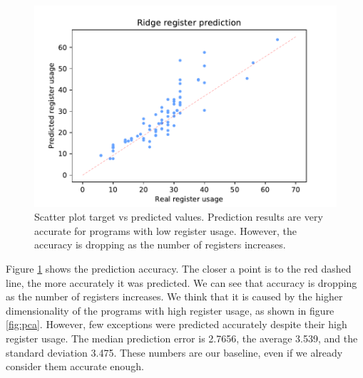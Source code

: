 \documentclass[sigplan,\review anonymous]{acmart}
\begin{document}
\begin{figure}
  \centering
  \includegraphics[width=\columnwidth]{images/ridge_pred.pdf}
  \caption{Scatter plot target vs predicted values. Prediction results are
  very accurate for programs with low register usage. However, the accuracy
  is dropping as the number of registers increases.}
  \label{fig:ridge_pred}
\end{figure}

Figure \ref{fig:ridge_pred} shows the prediction accuracy. The closer a point
is to the red dashed line, the more accurately it was predicted. We can see
that accuracy is dropping as the number of registers increases. We think that
it is caused by the higher dimensionality of the programs with high register
usage, as shown in figure \ref{fig:pca}. However, few exceptions were
predicted accurately despite their high register usage. The median prediction
error is 2.7656, the average 3.539, and the standard deviation 3.475. These
numbers are our baseline, even if we already consider them accurate enough.
\end{document}
